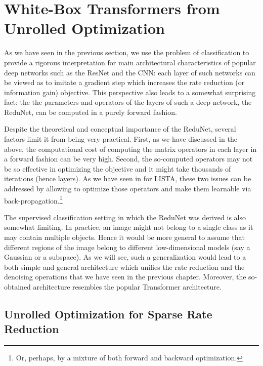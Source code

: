 \documentclass[../../book-main.tex]{subfiles}
\begin{document}
 




\section{White-Box Transformers from Unrolled Optimization}\label{sec:chap4-white-box-transformer}
As we have seen in the previous section, we use the problem of classification to provide a rigorous interpretation for main architectural characteristics of popular deep networks such as the ResNet and the CNN: each layer of such networks can be viewed as to imitate a gradient step which increases the rate reduction (or information gain) objective. This perspective also leads to a somewhat surprising fact: the the parameters and operators  of the layers of such a deep network, the ReduNet, can be  computed in a purely forward fashion.

Despite the theoretical and conceptual importance of the ReduNet, several factors limit it from being very practical. First, as we have discussed in the above, the computational cost of computing the matrix operators in  each layer in a forward fashion can be very high. Second, the so-computed operators may not be so effective in optimizing the objective and it might take thousands of iterations (hence layers). As we have seen  in  for LISTA, these two issues can be addressed by allowing to optimize those operators and make them learnable via back-propagation.\footnote{Or, perhaps, by a mixture of both forward and backward optimization.}

The supervised classification setting in which the ReduNet was derived is also somewhat limiting. In practice, an image might not belong to a single class as it may contain multiple objects. Hence it would be more general to assume that different regions of the image belong to  different low-dimensional models (say a Gaussian or a subspace). As we will see, such a generalization would lead to a both simple and general architecture which unifies the rate reduction and the denoising operations that we have seen in the previous chapter. Moreover, the so-obtained architecture resembles the popular Transformer architecture.



\subsection{Unrolled Optimization for Sparse Rate Reduction}
\end{document}
